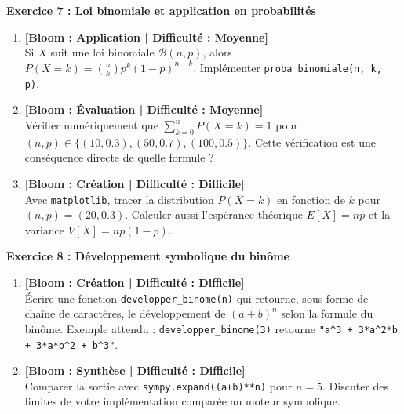 \noindent\textbf{Exercice 7 : Loi binomiale et application en probabilités}
\begin{enumerate}
    \item \textbf{[Bloom : Application | Difficulté : Moyenne]} \\
    Si $X$ suit une loi binomiale $\mathcal{B}(n, p)$, alors $P(X = k) = \binom{n}{k} p^k (1-p)^{n-k}$. Implémenter \texttt{proba\_binomiale(n, k, p)}.
    \item \textbf{[Bloom : Évaluation | Difficulté : Moyenne]} \\
    Vérifier numériquement que $\sum_{k=0}^{n} P(X = k) = 1$ pour $(n, p) \in \{(10, 0.3), (50, 0.7), (100, 0.5)\}$. Cette vérification est une conséquence directe de quelle formule ?
    \item \textbf{[Bloom : Création | Difficulté : Difficile]} \\
    Avec \texttt{matplotlib}, tracer la distribution $P(X = k)$ en fonction de $k$ pour $(n, p) = (20, 0.3)$. Calculer aussi l'espérance théorique $E[X] = np$ et la variance $V[X] = np(1-p)$.
\end{enumerate}

\vspace{0.3cm}

\noindent\textbf{Exercice 8 : Développement symbolique du binôme}
\begin{enumerate}
    \item \textbf{[Bloom : Création | Difficulté : Difficile]} \\
    Écrire une fonction \texttt{developper\_binome(n)} qui retourne, sous forme de chaîne de caractères, le développement de $(a + b)^n$ selon la formule du binôme. Exemple attendu :
    \texttt{developper\_binome(3)} retourne \texttt{"a\^{}3 + 3*a\^{}2*b + 3*a*b\^{}2 + b\^{}3"}.
    \item \textbf{[Bloom : Synthèse | Difficulté : Difficile]} \\
    Comparer la sortie avec \texttt{sympy.expand((a+b)**n)} pour $n = 5$. Discuter des limites de votre implémentation comparée au moteur symbolique.
\end{enumerate}
